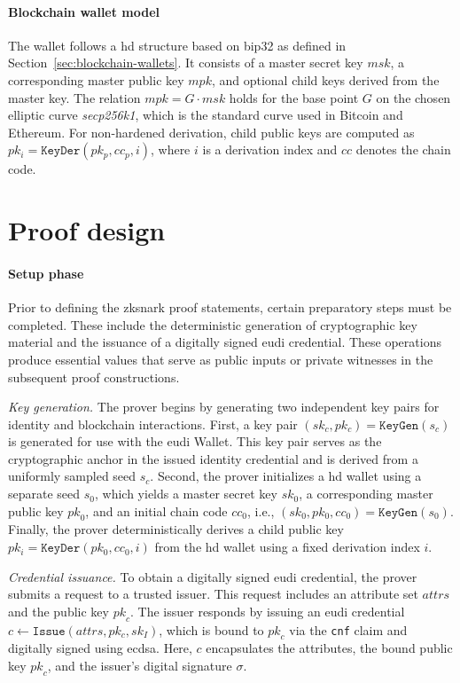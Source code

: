 \paragraph{Blockchain wallet model}
The wallet follows a \acrshort{hd} structure based on \acrshort{bip32} as defined in Section~\ref{sec:blockchain-wallets}. It consists of a master secret key $\mathit{msk}$, a corresponding master public key $\mathit{mpk}$, and optional child keys derived from the master key. The relation $mpk = G \cdot msk$ holds for the base point $G$ on the chosen elliptic curve \emph{secp256k1}, which is the standard curve used in Bitcoin and Ethereum. For non-hardened derivation, child public keys are computed as $pk_i = \texttt{KeyDer}(pk_p, cc_p, i)$, where $\mathit{i}$ is a derivation index and $\mathit{cc}$ denotes the chain code.

\section{Proof design}
\label{sec:proof-design}

\paragraph{Setup phase}
Prior to defining the \acrshort{zksnark} proof statements, certain preparatory steps must be completed. These include the deterministic generation of cryptographic key material and the issuance of a digitally signed \acrshort{eudi} credential. These operations produce essential values that serve as public inputs or private witnesses in the subsequent proof constructions.

\medskip	
\textit{Key generation.}
The prover begins by generating two independent key pairs for identity and blockchain interactions. First, a key pair $(sk_c, pk_c) = \texttt{KeyGen}(s_c)$ is generated for use with the \acrshort{eudi} Wallet. This key pair serves as the cryptographic anchor in the issued identity credential and is derived from a uniformly sampled seed $s_c$. Second, the prover initializes a \acrshort{hd} wallet using a separate seed $s_0$, which yields a master secret key $\mathit{sk}_0$, a corresponding master public key $\mathit{pk}_0$, and an initial chain code $\mathit{cc}_0$, i.e., $(sk_0, pk_0, cc_0) = \texttt{KeyGen}(s_0)$. Finally, the prover deterministically derives a child public key $pk_i = \texttt{KeyDer}(pk_0, cc_0, i)$ from the \acrshort{hd} wallet using a fixed derivation index $\mathit{i}$.

\medskip	
\textit{Credential issuance.}
To obtain a digitally signed \acrshort{eudi} credential, the prover submits a request to a trusted issuer. This request includes an attribute set $\mathit{attrs}$ and the public key $\mathit{pk}_c$. The issuer responds by issuing an \acrshort{eudi} credential $c \leftarrow \texttt{Issue}(attrs, pk_c, sk_I)$, which is bound to $\mathit{pk}_c$ via the \texttt{cnf} claim and digitally signed using \acrshort{ecdsa}. Here, $c$ encapsulates the attributes, the bound public key $\mathit{pk}_c$, and the issuer’s digital signature $\sigma$.

